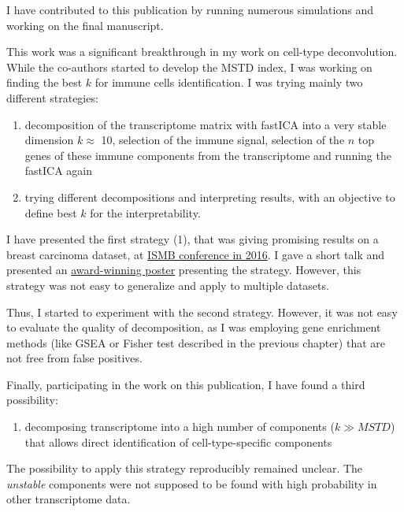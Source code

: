 \documentclass[12pt,]{book}
\providecommand{\tightlist}{%
  \setlength{\itemsep}{0pt}\setlength{\parskip}{0pt}}
\theoremstyle{definition}
\theoremstyle{definition}
\theoremstyle{definition}
\theoremstyle{remark}
\begin{document}
I have contributed to this publication by running numerous simulations
and working on the final manuscript.

This work was a significant breakthrough in my work on cell-type
deconvolution. While the co-authors started to develop the MSTD index, I
was working on finding the best \(k\) for immune cells identification. I
was trying mainly two different strategies:

\begin{enumerate}
\def\labelenumi{\arabic{enumi}.}
\tightlist
\item
  decomposition of the transcriptome matrix with fastICA into a very
  stable dimension \(k\)\(\approx\) 10, selection of the immune signal,
  selection of the \(n\) top genes of these immune components from the
  transcriptome and running the fastICA again
\item
  trying different decompositions and interpreting results, with an
  objective to define best \(k\) for the interpretability.
\end{enumerate}

I have presented the first strategy (1), that was giving promising
results on a breast carcinoma dataset, at
\href{https://www.iscb.org/ismb2016}{ISMB conference in 2016}. I gave a
short talk and presented an
\href{https://www.iscb.org/ismb2016general/ismb2016-awardwinners\#f1000}{award-winning
poster} presenting the strategy. However, this strategy was not easy to
generalize and apply to multiple datasets.

Thus, I started to experiment with the second strategy. However, it was
not easy to evaluate the quality of decomposition, as I was employing
gene enrichment methods (like GSEA or Fisher test described in the
previous chapter) that are not free from false positives.

Finally, participating in the work on this publication, I have found a
third possibility:

\begin{enumerate}
\def\labelenumi{\arabic{enumi}.}
\setcounter{enumi}{2}
\tightlist
\item
  decomposing transcriptome into a high number of components
  (\(k \gg MSTD\)) that allows direct identification of
  cell-type-specific components
\end{enumerate}

The possibility to apply this strategy reproducibly remained unclear.
The \emph{unstable} components were not supposed to be found with high
probability in other transcriptome data.
\end{document}
